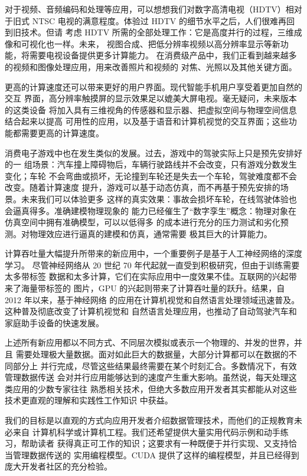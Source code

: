 对于视频、音频编码和处理等应用，可以想想我们对数字高清电视（HDTV）相对于旧式
NTSC 电视的满意程度。体验过 HDTV 的细节水平之后，人们很难再回到旧技术。但请
考虑 HDTV 所需的全部处理工作：它是高度并行的过程，三维成像和可视化也一样。未来，
视图合成、把低分辨率视频以高分辨率显示等新功能，将需要电视设备提供更多计算能力。
在消费级产品中，我们正看到越来越多的视频和图像处理应用，用来改善照片和视频的
对焦、光照以及其他关键方面。

更高的计算速度还可以带来更好的用户界面。现代智能手机用户享受着更加自然的交互
界面，高分辨率触摸屏的显示效果足以媲美大屏电视。毫无疑问，未来版本的这类设备
将加入具有三维视角的传感器和显示器、把虚拟空间与物理空间信息结合起来以提高
可用性的应用，以及基于语音和计算机视觉的交互界面；这些功能都需要更高的计算速度。

消费电子游戏中也在发生类似的发展。过去，游戏中的驾驶实际上只是预先安排好的一
组场景：汽车撞上障碍物后，车辆行驶路线并不会改变，只有游戏分数发生变化；车轮
不会弯曲或损坏，无论撞到车轮还是失去一个车轮，驾驶难度都不会改变。随着计算速度
提升，游戏可以基于动态仿真，而不再基于预先安排的场景。未来我们可以体验更多
这样的真实效果：事故会损坏车轮，在线驾驶体验也会逼真得多。准确建模物理现象的
能力已经催生了“数字孪生”概念：物理对象在仿真空间中拥有准确模型，可以以低得多
的成本进行充分的压力测试和劣化预测。对物理效应进行逼真的建模和仿真，通常需要
极其巨大的计算能力。

计算吞吐量大幅提升所带来的新应用中，一个重要例子是基于人工神经网络的深度学习。
尽管神经网络从 20 世纪 70 年代起就一直受到积极研究，但由于训练需要太多带标签
数据和太多计算，它们在实际应用中一度效果不佳。互联网的兴起带来了海量带标签的
图片，GPU 的兴起则带来了计算吞吐量的跃升。结果，自 2012 年以来，基于神经网络
的应用在计算机视觉和自然语言处理领域迅速普及。这种普及彻底改变了计算机视觉和
自然语言处理应用，也推动了自动驾驶汽车和家庭助手设备的快速发展。

上述所有新应用都以不同方式、不同层次模拟或表示一个物理的、并发的世界，并且
需要处理极大量数据。面对如此巨大的数据量，大部分计算都可以在数据的不同部分上
并行完成，尽管这些结果最终需要在某个时刻汇合。多数情况下，有效管理数据传送
会对并行应用能够达到的速度产生重大影响。虽然说，每天处理这类应用的少数专家往往
熟悉相关技术，但绝大多数应用开发者其实都能从对这些技术更直观的理解和实践性工作知识
中获益。

我们的目标是以直观的方式向应用开发者介绍数据管理技术，而他们的正规教育未必来自
计算机科学或计算机工程。我们还希望提供大量实用代码示例和动手练习，帮助读者
获得真正可工作的知识；这要求有一种既便于并行实现、又支持恰当管理数据传送的
实用编程模型。CUDA 提供了这样的编程模型，并且已经得到庞大开发者社区的充分检验。

